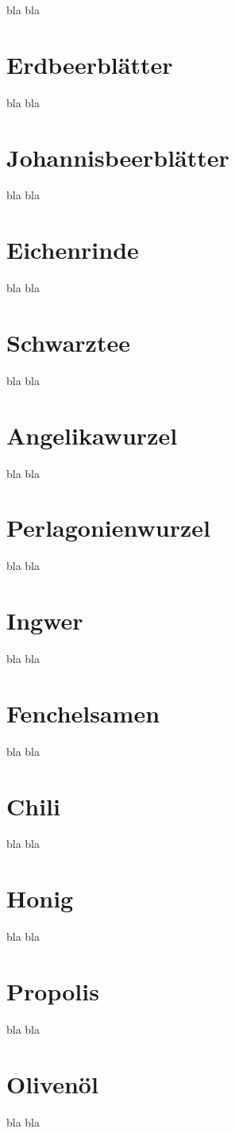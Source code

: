 bla bla

\section{Erdbeerblätter}

bla bla

\section{Johannisbeerblätter}

bla bla

\section{Eichenrinde}

bla bla

\section{Schwarztee}

bla bla

\section{Angelikawurzel}

bla bla

\section{Perlagonienwurzel}

bla bla

\section{Ingwer}

bla bla

\section{Fenchelsamen}

bla bla

\section{Chili}

bla bla

\section{Honig}

bla bla

\section{Propolis}

bla bla

\section{Olivenöl}

bla bla


